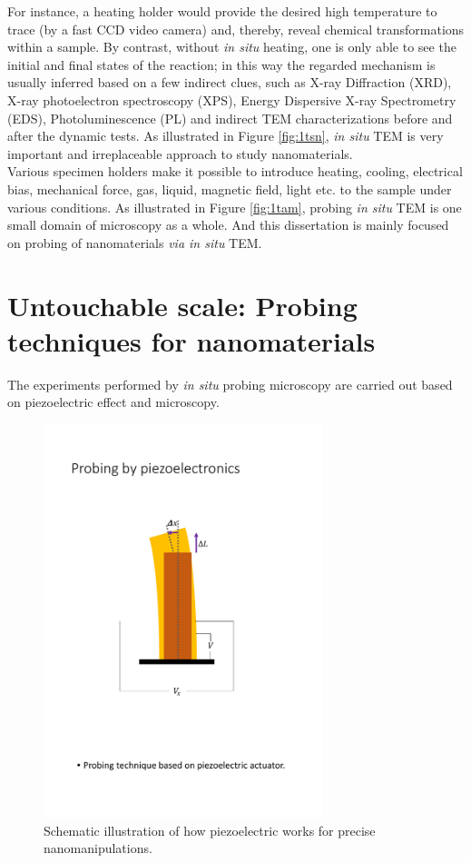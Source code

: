 For instance, a heating holder would provide the desired high temperature to trace (by a fast CCD video camera) and, thereby, reveal chemical transformations within a sample. By contrast, without \emph{in situ} heating, one is  only able to see the initial and final states of the reaction; in this way the regarded mechanism is usually inferred based on a few indirect clues, such as X-ray Diffraction (XRD), X-ray photoelectron spectroscopy (XPS), Energy Dispersive X-ray Spectrometry (EDS), Photoluminescence (PL) and indirect TEM characterizations before and after the dynamic tests. As illustrated in Figure \ref{fig:1tsn}, \emph{in situ} TEM is very important and irreplaceable approach to study nanomaterials. \\

Various specimen holders make it possible to introduce heating, cooling, electrical bias, mechanical force, gas, liquid, magnetic field, light etc. to the sample under various conditions. As illustrated in Figure \ref{fig:1tam}, probing \emph{in situ} TEM is one small domain of microscopy as a whole. And this dissertation is mainly focused on probing of nanomaterials \textit{via in situ} TEM. 

\section{Untouchable scale: Probing techniques for nanomaterials}

The experiments performed by \textit{in situ} probing microscopy are carried out based on piezoelectric effect and microscopy. \\

\begin{figure}  
\centering
\includegraphics[width=230pt]{figures/figure1_piezo.pdf}
\caption[Probing by piezoelectronics]{Schematic illustration of how piezoelectric works for precise nanomanipulations.
\label{fig:1piezo}}
\end{figure}

